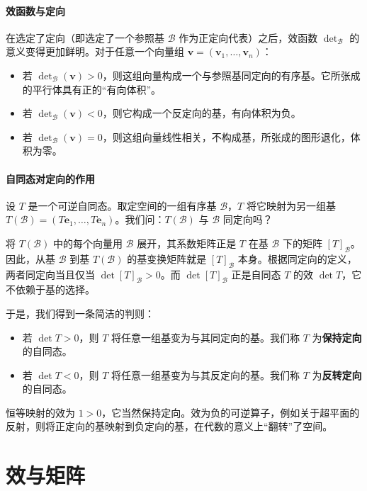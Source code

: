 \documentclass[12pt,UTF8]{ctexbook}
\begin{document}
\paragraph{效函数与定向}
在选定了定向（即选定了一个参照基 $\mathcal{B}$ 作为正定向代表）之后，效函数 $\det_{\mathcal{B}}$ 的意义变得更加鲜明。对于任意一个向量组 $\mathbf{v} = (\mathbf{v}_1, \dots, \mathbf{v}_n)$：
\begin{itemize}
    \item 若 $\det_{\mathcal{B}}(\mathbf{v}) > 0$，则这组向量构成一个与参照基同定向的有序基。它所张成的平行体具有正的“有向体积”。
    \item 若 $\det_{\mathcal{B}}(\mathbf{v}) < 0$，则它构成一个反定向的基，有向体积为负。
    \item 若 $\det_{\mathcal{B}}(\mathbf{v}) = 0$，则这组向量线性相关，不构成基，所张成的图形退化，体积为零。
\end{itemize}

\paragraph{自同态对定向的作用}
设 $T$ 是一个可逆自同态。取定空间的一组有序基 $\mathcal{B}$，$T$ 将它映射为另一组基 $T(\mathcal{B}) = (T\mathbf{e}_1, \dots, T\mathbf{e}_n)$。我们问：$T(\mathcal{B})$ 与 $\mathcal{B}$ 同定向吗？

将 $T(\mathcal{B})$ 中的每个向量用 $\mathcal{B}$ 展开，其系数矩阵正是 $T$ 在基 $\mathcal{B}$ 下的矩阵 $[T]_{\mathcal{B}}$。因此，从基 $\mathcal{B}$ 到基 $T(\mathcal{B})$ 的基变换矩阵就是 $[T]_{\mathcal{B}}$ 本身。根据同定向的定义，两者同定向当且仅当 $\det [T]_{\mathcal{B}} > 0$。而 $\det [T]_{\mathcal{B}}$ 正是自同态 $T$ 的效 $\det T$，它不依赖于基的选择。

于是，我们得到一条简洁的判则：
\begin{itemize}
    \item 若 $\det T > 0$，则 $T$ 将任意一组基变为与其同定向的基。我们称 $T$ 为\textbf{保持定向}的自同态。
    \item 若 $\det T < 0$，则 $T$ 将任意一组基变为与其反定向的基。我们称 $T$ 为\textbf{反转定向}的自同态。
\end{itemize}

恒等映射的效为 $1 > 0$，它当然保持定向。效为负的可逆算子，例如关于超平面的反射，则将正定向的基映射到负定向的基，在代数的意义上“翻转”了空间。

\section{效与矩阵}
\end{document}
